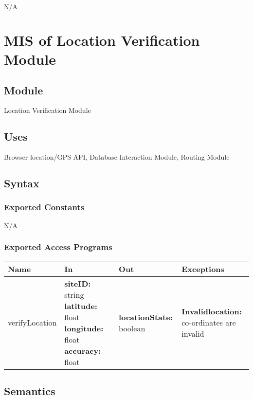 \documentclass[12pt, titlepage]{article}
\begin{document}
N/A

\section{MIS of Location Verification Module} \label{Module}

\subsection{Module}

Location Verification Module

\subsection{Uses}

Browser location/GPS API, Database Interaction Module, Routing Module

\subsection{Syntax}

\subsubsection{Exported Constants}

N/A

\subsubsection{Exported Access Programs}

\begin{center}
  \begin{tabular}{>{\raggedright}p{2.75cm} >{\raggedright}p{3.25cm}
    >{\raggedright}p{4.5cm} p{5cm}}
    \hline
    \textbf{Name} & \textbf{In} & \textbf{Out} & \textbf{Exceptions} \\
    \hline
    verifyLocation & \textbf{siteID:} string \newline
    \textbf{latitude:} float \newline
    \textbf{longitude:} float \newline \textbf{accuracy:} float &
    \textbf{locationState:} boolean &
    \textbf{Invalidlocation:} co-ordinates are invalid \\
    \hline
  \end{tabular}
\end{center}

\subsection{Semantics}
\end{document}
